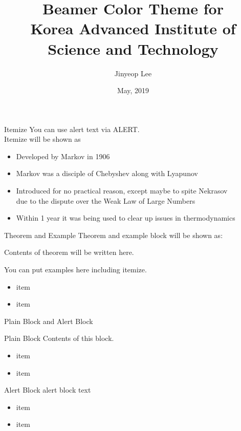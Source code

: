 \documentclass[english]{beamer} %
\title[Beamer Color Theme for KAIST]{Beamer Color Theme for \\Korea Advanced Institute of Science and Technology}
\author{Jinyeop Lee}
\institute[KAIST]
{
  Department of Mathematical Sciences\\
  KAIST
}
\date{May, 2019}
\begin{document}
\begin{frame}
  \titlepage
\end{frame}

\begin{frame}{Itemize}
You can use alert text via \alert{ALERT}.\\
Itemize will be shown as
\begin{itemize}[<+->]
\item Developed by Markov in 1906
\item Markov was a disciple of Chebyshev  along with Lyapunov
\item Introduced for no practical reason, except maybe to spite Nekrasov\\
due to the dispute over the Weak Law of Large Numbers
\item Within 1 year it was being used to clear up issues in thermodynamics
\end{itemize}
\end{frame}

\begin{frame}{Theorem and Example}
Theorem and example block will be shown as:
\begin{theorem}
	Contents of theorem will be written here.
\end{theorem}

\begin{example}
	You can put examples here including itemize.
	\begin{itemize}
		\item item
		\item item
	\end{itemize}
\end{example}
\end{frame}

\begin{frame}{Plain Block and Alert Block}

\begin{block}{Plain Block}
	Contents of this block.
	\begin{itemize}
		\item item
		\item item
	\end{itemize}
\end{block}

\begin{alertblock}{Alert Block}
	alert block text
	\begin{itemize}
		\item item
		\item item
	\end{itemize}
\end{alertblock}
\end{frame}
\end{document}
